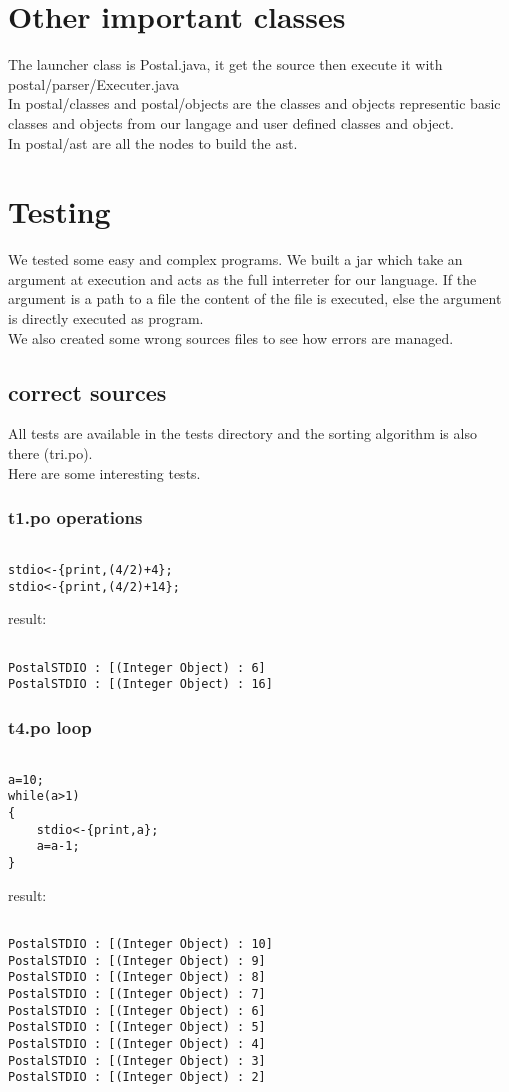 \documentclass{eplDoc}
\begin{document}
\section{Other important classes}
The launcher class is Postal.java, it get the source then execute it with postal/parser/Executer.java\\
In postal/classes and postal/objects are the classes and objects representic basic classes and objects from our langage and user defined classes and object.\\
In postal/ast are all the nodes to build the ast.

\section{Testing}
We tested some easy and complex programs.  We built a jar which take an argument at execution and acts as the full interreter for our language.  If the argument is a path to a file the content of the file is executed, else the argument is directly executed as program.\\
We also created some wrong sources files to see how errors are managed.
\subsection{correct sources}
All tests are available in the tests directory and the sorting algorithm is also there (tri.po).\\
Here are some interesting tests.
\subsubsection{t1.po operations}
\begin{lstlisting}
    
stdio<-{print,(4/2)+4};
stdio<-{print,(4/2)+14};
\end{lstlisting}
result:
\begin{lstlisting}
    
PostalSTDIO : [(Integer Object) : 6]
PostalSTDIO : [(Integer Object) : 16]
\end{lstlisting}

\subsubsection{t4.po loop}
\begin{lstlisting}
    
a=10;
while(a>1)
{
    stdio<-{print,a};
    a=a-1;
}
\end{lstlisting}
result:
\begin{lstlisting}
    
PostalSTDIO : [(Integer Object) : 10]
PostalSTDIO : [(Integer Object) : 9]
PostalSTDIO : [(Integer Object) : 8]
PostalSTDIO : [(Integer Object) : 7]
PostalSTDIO : [(Integer Object) : 6]
PostalSTDIO : [(Integer Object) : 5]
PostalSTDIO : [(Integer Object) : 4]
PostalSTDIO : [(Integer Object) : 3]
PostalSTDIO : [(Integer Object) : 2]
\end{lstlisting}
\end{document}
